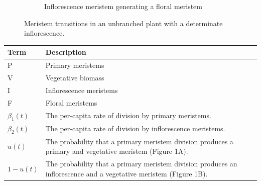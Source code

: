 \documentclass[12pt, oneside]{article}   	%
\begin{document}
\begin{figure}[hbt!]
\begin{subfigure}{.25\textwidth}
    \caption{Inflorescence meristem generating a floral meristem}
  \end{subfigure}
        \caption{Meristem transitions in an unbranched plant with a determinate inflorescence.}
    \label{fig:transitions-unbranched-determinate}
\end{figure}

%
\begin{table}[hbt!]
\footnotesize
\begin{tabularx}{\linewidth}{|l|X|}
\hline
\textbf{Term} & \textbf{Description} \\ \hline
 P    & Primary meristems            \\ \hline
 V   &  Vegetative biomass         \\ \hline
 I   &  Inflorescence meristems          \\ \hline
 F   &  Floral meristems          \\ \hline
 $\beta_1(t)$  &  The per-capita rate of division by primary meristems.     \\ \hline
  $\beta_2(t)$  &  The per-capita rate of division by inflorescence meristems.     \\ \hline
 $u(t)$   &  The probability that a primary meristem division produces a primary and vegetative meristem (Figure 1A).       \\ \hline
  $1-u(t)$   &  The probability that a primary meristem division produces an inflorescence and a vegetative meristem (Figure 1B).       \\ \hline
\end{tabularx}
\end{table}
\end{document}
